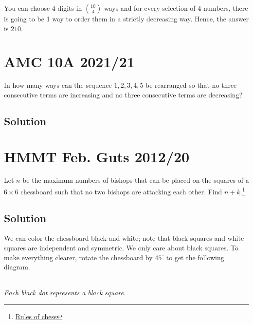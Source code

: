 \documentclass{article}
\begin{document}
You can choose $4$ digits in $\binom{10}{4}$ ways and for every selection of $4$ numbers, there is going to be 1 way to order them in a strictly decreasing way. Hence, the answer is $210.$

\pagebreak\section{AMC 10A 2021/21}

In how many ways can the sequence $1, 2, 3, 4, 5$ be rearranged so that no three consecutive terms are increasing and no three consecutive terms are decreasing?

\subsection{Solution}

\pagebreak\section{HMMT Feb. Guts 2012/20}

Let $n$ be the maximum numbers of bishops that can be placed on the squares of a $6\times 6$ chessboard such that no two bishops are attacking each other. Find $n+k.$\footnote{\href{https://www.ichess.net/blog/chess-pieces-moves/}{Rules of chess}}

\subsection{Solution}

We can color the chessboard black and white; note that black squares and white squares are independent and symmetric. We only care about black squares. To make everything clearer, rotate the chessboard by $45^{\circ}$ to get the following diagram.

\begin{center}
\\[\baselineskip]
\textit{Each black dot represents a black square.}
\end{center}
\end{document}
